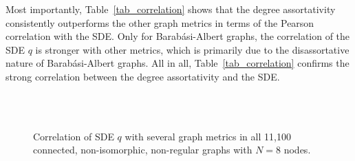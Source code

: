 \documentclass{comnet}%
\newcommand{\BA}{Barab{\'a}si-Albert}
\begin{document}
Most importantly, Table~\ref{tab_correlation} shows that the degree assortativity consistently outperforms the other graph metrics in terms of the Pearson correlation with the SDE. Only for \BA{} graphs, the correlation of the SDE $q$ is stronger with other metrics, which is primarily due to the disassortative nature of \BA{} graphs. All in all, Table~\ref{tab_correlation} confirms the strong correlation between the degree assortativity and the SDE.


\begin{figure}[H]
	\centering
	 \\
	 \\
	\caption{Correlation of SDE $q$ with several graph metrics in all 11,100 connected, non-isomorphic, non-regular graphs with $N=8$ nodes.}
	\label{fig_correlation}
\end{figure}
\end{document}

